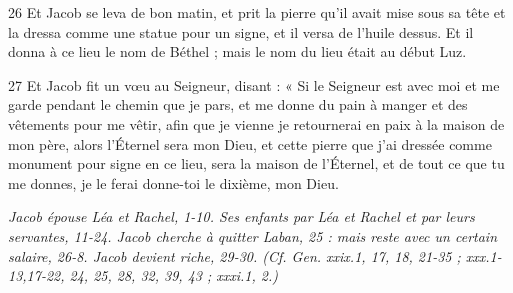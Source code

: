 \par 26 Et Jacob se leva de bon matin, et prit la pierre qu'il avait mise sous sa tête et la dressa comme une statue pour un signe, et il versa de l'huile dessus. Et il donna à ce lieu le nom de Béthel ; mais le nom du lieu était au début Luz.
\par 27 Et Jacob fit un vœu au Seigneur, disant : « Si le Seigneur est avec moi et me garde pendant le chemin que je pars, et me donne du pain à manger et des vêtements pour me vêtir, afin que je vienne je retournerai en paix à la maison de mon père, alors l'Éternel sera mon Dieu, et cette pierre que j'ai dressée comme monument pour signe en ce lieu, sera la maison de l'Éternel, et de tout ce que tu me donnes, je le ferai donne-toi le dixième, mon Dieu.


\par \textit{Jacob épouse Léa et Rachel, 1-10. Ses enfants par Léa et Rachel et par leurs servantes, 11-24. Jacob cherche à quitter Laban, 25 : mais reste avec un certain salaire, 26-8. Jacob devient riche, 29-30. (Cf. Gen. xxix.1, 17, 18, 21-35 ; xxx.1-13,17-22, 24, 25, 28, 32, 39, 43 ; xxxi.1, 2.)}

